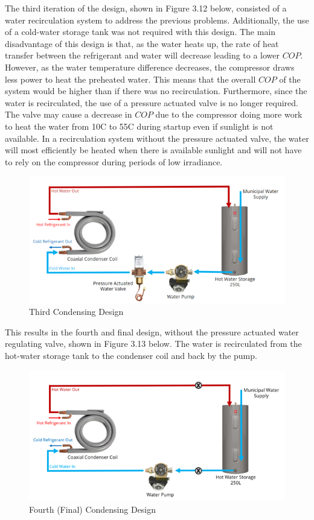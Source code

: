 \medskip
The third iteration of the design, shown in Figure 3.12 below, consisted of a water recirculation system to address the previous problems. Additionally, the use of a cold-water storage tank was not required with this design. The main disadvantage of this design is that, as the water heats up, the rate of heat transfer between the refrigerant and water will decrease leading to a lower $COP$. However, as the water temperature difference decreases, the compressor draws less power to heat the preheated water. This means that the overall $COP$ of the system would be higher than if there was no recirculation. Furthermore, since the water is recirculated, the use of a pressure actuated valve is no longer required. The valve may cause a decrease in $COP$ due to the compressor doing more work to heat the water from 10\textdegree C to 55\textdegree C during startup even if sunlight is not available. In a recirculation system without the pressure actuated valve, the water will most efficiently be heated when there is available sunlight and will not have to rely on the compressor during periods of low irradiance.

\medskip
\begin{figure}[H]
    \centering
    \includegraphics[width=12cm]{images/condensor3.png}
    \caption{Third Condensing Design}
\end{figure}

\medskip
This results in the fourth and final design, without the pressure actuated water regulating valve, shown in Figure 3.13 below. The water is recirculated from the hot-water storage tank to the condenser coil and back by the pump.

\medskip
\begin{figure}[H]
    \centering
    \includegraphics[width=12cm]{images/condensor4.png}
    \caption{Fourth (Final) Condensing Design}
\end{figure}

